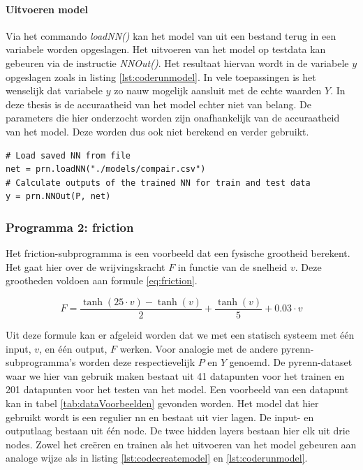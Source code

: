 			\paragraph{Uitvoeren model} 
			Via het commando \textit{loadNN()} kan het model van uit een bestand terug in een variabele worden opgeslagen. Het uitvoeren van het model op testdata kan gebeuren via de instructie \textit{NNOut()}. Het resultaat hiervan wordt in de variabele $y$ opgeslagen zoals in listing \ref{lst:coderunmodel}. In vele toepassingen is het wenselijk dat variabele $y$ zo nauw mogelijk aansluit met de echte waarden $Y$. In deze thesis is de accuraatheid van het model echter niet van belang. De parameters die hier onderzocht worden zijn onafhankelijk van de accuraatheid van het model. Deze worden dus ook niet berekend en verder gebruikt. 
	\begin{lstlisting}[caption={uitvoeren van pyrenn-model.},captionpos=b, label = {lst:coderunmodel}]
# Load saved NN from file
net = prn.loadNN("./models/compair.csv")
# Calculate outputs of the trained NN for train and test data	
y = prn.NNOut(P, net)
\end{lstlisting}
		
		\subsubsection{Programma 2: friction}
		Het friction-subprogramma is een voorbeeld dat een fysische grootheid berekent. Het gaat hier over de wrijvingskracht $F$ in functie van de snelheid $v$. Deze grootheden voldoen aan formule \ref{eq:friction}. 
	
		\begin{equation}\label{eq:friction}
					F = \frac{\tanh(25 \cdot v)- \tanh(v)}{2} + \frac{\tanh(v)}{5}+0.03\cdot v			
		\end{equation}
	
		Uit deze formule kan er afgeleid worden dat we met een statisch systeem met \'e\'en input, $v$, en \'e\'en output, $F$ werken. Voor analogie met de andere pyrenn-subprogramma's worden deze respectievelijk $P$ en $Y$ genoemd. De pyrenn-dataset waar we hier van gebruik maken bestaat uit 41 datapunten voor het trainen en 201 datapunten voor het testen van het model. Een voorbeeld van een datapunt kan in tabel \ref{tab:dataVoorbeelden} gevonden worden. Het model dat hier gebruikt wordt is een regulier \gls{nn} en bestaat uit vier lagen. De input- en outputlaag bestaan uit \'e\'en node. De twee hidden layers bestaan hier elk uit drie nodes. Zowel het cre\"eren en trainen als het uitvoeren van het model gebeuren aan analoge wijze als in listing \ref{lst:codecreatemodel} en \ref{lst:coderunmodel}.
						
